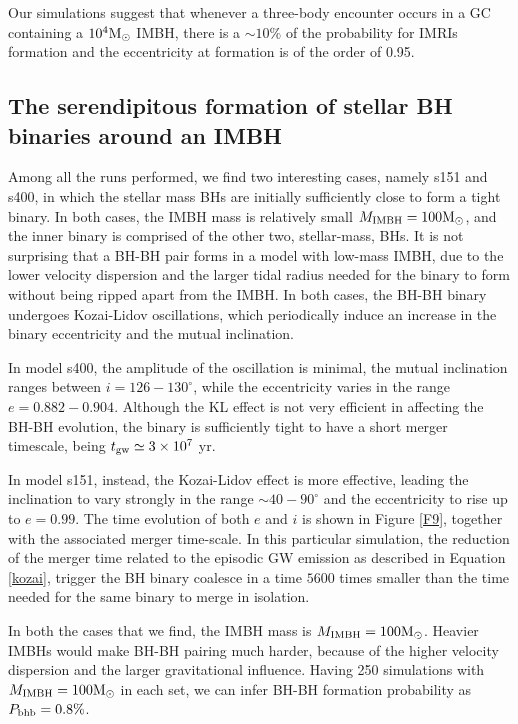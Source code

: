 \documentclass[twocolumn]{aastex62}
\newcommand{\Ms}{{\rm M}_\odot}
\newcommand{\ibh}{{\rm IMBH}}
\begin{document}
Our simulations suggest that whenever a three-body encounter occurs in a GC containing a $10^4\Ms$ IMBH, there is a $\sim 10\%$ of the probability for IMRIs formation and the eccentricity at formation is of the order of 0.95. 

\subsection{The serendipitous formation of stellar BH binaries around an IMBH}

Among all the runs performed, we find two interesting cases, namely s151 and s400, in which the stellar mass BHs are initially sufficiently close to form a tight binary. In both cases, the IMBH mass is relatively small $M_{\ibh} = 100\Ms$, and the inner binary is comprised of the other two, stellar-mass, BHs. It is not surprising that a BH-BH pair forms in a model with low-mass IMBH, due to the lower velocity dispersion and the larger tidal radius needed for the binary to form without being ripped apart from the IMBH. In both cases, the BH-BH binary undergoes Kozai-Lidov oscillations, which periodically induce an increase in the binary eccentricity and the mutual inclination.

In model s400, the amplitude of the oscillation is minimal, the mutual inclination ranges between $i = 126-130^\circ$, while the eccentricity varies in the range $e = 0.882-0.904$. Although the KL effect is not very efficient in affecting the BH-BH evolution, the binary is sufficiently tight to have a short merger timescale, being $t_{\rm gw} \simeq 3\times 10^7$ yr.

In model s151, instead, the Kozai-Lidov effect is more effective, leading the inclination to vary strongly in the range $\sim 40-90^\circ$ and the eccentricity to rise up to $e = 0.99$. The time evolution of both $e$ and $i$ is shown in Figure \ref{F9}, together with the associated merger time-scale. 
In this particular simulation, the reduction of the merger time related to the episodic GW emission as described in Equation \ref{kozai}, trigger the BH binary coalesce in a time $5600$ times smaller than the time needed for the same binary to merge in isolation.

In both the cases that we find, the IMBH mass is $M_\ibh=100\Ms$. Heavier IMBHs would make BH-BH pairing much harder, because of the higher velocity dispersion and the larger gravitational influence. Having 250 simulations with $M_\ibh=100\Ms$ in each set, we can infer BH-BH formation probability as $P_{\rm bhb} = 0.8\%$.
\end{document}
